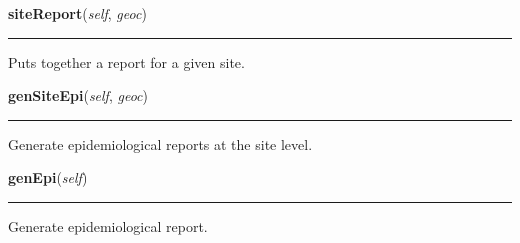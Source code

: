     \label{Epigrass:report:report:siteReport}

    \vspace{0.5ex}

    \begin{boxedminipage}{\textwidth}

    \raggedright \textbf{siteReport}(\textit{self}, \textit{geoc})

    \vspace{-1.5ex}

    \rule{\textwidth}{0.5\fboxrule}
    Puts together a report for a given site.

    \vspace{1ex}

    \end{boxedminipage}

    \label{Epigrass:report:report:genSiteEpi}

    \vspace{0.5ex}

    \begin{boxedminipage}{\textwidth}

    \raggedright \textbf{genSiteEpi}(\textit{self}, \textit{geoc})

    \vspace{-1.5ex}

    \rule{\textwidth}{0.5\fboxrule}
    Generate epidemiological reports at the site level.

    \vspace{1ex}

    \end{boxedminipage}

    \label{Epigrass:report:report:genEpi}

    \vspace{0.5ex}

    \begin{boxedminipage}{\textwidth}

    \raggedright \textbf{genEpi}(\textit{self})

    \vspace{-1.5ex}

    \rule{\textwidth}{0.5\fboxrule}
    Generate epidemiological report.

    \vspace{1ex}

    \end{boxedminipage}

